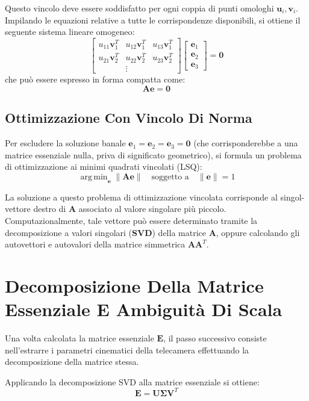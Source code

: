 ﻿\documentclass[11pt, a4paper]{article}
\DeclareMathOperator*{\argmin}{arg\,min}
\begin{document}
Questo vincolo deve essere soddisfatto per ogni coppia di punti omologhi $\bm{u}_i, \bm{v}_i$. Impilando le equazioni relative a tutte le corrispondenze disponibili, si ottiene il seguente sistema lineare omogeneo:
\[ \begin{bmatrix} u_{11}\bm{v}_1^T & u_{12}\bm{v}_1^T & u_{13}\bm{v}_1^T \\ u_{21}\bm{v}_2^T & u_{22}\bm{v}_2^T & u_{23}\bm{v}_2^T \\ & \vdots & \end{bmatrix} \begin{bmatrix} \bm{e}_1 \\ \bm{e}_2 \\ \bm{e}_3 \end{bmatrix} = \bm{0} \]
che può essere espresso in forma compatta come:
\[ \boxed{\bm{A}\bm{e} = \bm{0}} \]

\subsection{Ottimizzazione Con Vincolo Di Norma}
Per escludere la soluzione banale $\bm{e}_1 = \bm{e}_2 = \bm{e}_3 = \bm{0}$ (che corrisponderebbe a una matrice essenziale nulla, priva di significato geometrico), si formula un problema di ottimizzazione ai minimi quadrati vincolati (LSQ):
\[ \boxed{\argmin_{\bm{e}} \lVert \bm{A}\bm{e} \rVert \quad \text{soggetto a} \quad \lVert \bm{e} \rVert = 1} \]

La soluzione a questo problema di ottimizzazione vincolata corrisponde al singol-vettore destro di $\bm{A}$ associato al valore singolare più piccolo. Computazionalmente, tale vettore può essere determinato tramite la decomposizione a valori singolari (\textbf{SVD}) della matrice $\bm{A}$, oppure calcolando gli autovettori e autovalori della matrice simmetrica $\bm{A}\bm{A}^T$.

\newpage

\section{Decomposizione Della Matrice Essenziale E Ambiguità Di Scala}

Una volta calcolata la matrice essenziale $\bm{E}$, il passo successivo consiste nell'estrarre i parametri cinematici della telecamera effettuando la decomposizione della matrice stessa.

Applicando la decomposizione SVD alla matrice essenziale si ottiene:
\[ \bm{E} = \bm{U}\bm{\Sigma}\bm{V}^T \]
\end{document}

